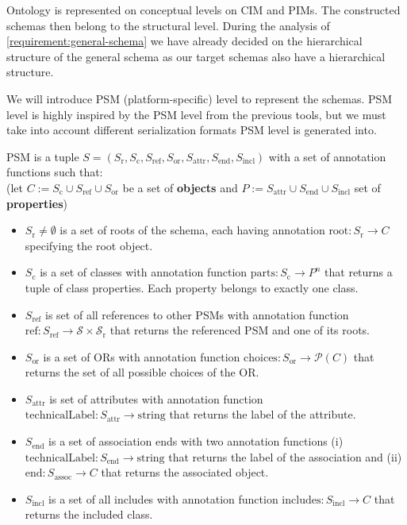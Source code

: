 Ontology is represented on conceptual levels on CIM and PIMs. The constructed schemas then belong to the structural level. During the analysis of \autoref{requirement:general-schema} we have already decided on the hierarchical structure of the general schema as our target schemas also have a hierarchical structure.

We will introduce PSM (platform-specific) level to represent the schemas. PSM level is highly inspired by the PSM level from the previous tools, but we must take into account different serialization formats PSM level is generated into.

\begin{definition}[PSM]
    PSM is a tuple $S=(S_{\textrm{r}}, S_{\textrm{c}}, S_{\textrm{ref}}, S_{\textrm{or}}, S_{\textrm{attr}}, S_{\textrm{end}}, S_{\textrm{incl}})$ with a set of annotation functions such that:
    \\(let $C:=S_{\textrm{c}}\cup S_{\textrm{ref}}\cup S_{\textrm{or}}$ be a set of \textbf{objects} and $P:=S_{\textrm{attr}}\cup S_{\textrm{end}}\cup S_{\textrm{incl}}$ set of \textbf{properties})
    \begin{itemize}
        \item $S_{\textrm{r}} \neq \emptyset$ is a set of roots of the schema, each having annotation $\textrm{root}: S_{\textrm{r}} \rightarrow C$ specifying the root object.

        \item $S_{\textrm{c}}$ is a set of classes with annotation function $\textrm{parts}: S_{\textrm{c}} \rightarrow P^n$ that returns a tuple of class properties. Each property belongs to exactly one class.

        \item $S_{\textrm{ref}}$ is set of all references to other PSMs with annotation function $\textrm{ref}: S_{\textrm{ref}} \rightarrow \mathcal{S} \times \mathcal{S}_{\textrm{r}}$ that returns the referenced PSM and one of its roots.

        \item $S_{\textrm{or}}$ is a set of ORs with annotation function $\textrm{choices}: S_{\textrm{or}} \rightarrow \mathcal{P}(C)$ that returns the set of all possible choices of the OR.

        \item $S_{\textrm{attr}}$ is set of attributes with annotation function $\textrm{technicalLabel}: S_{\textrm{attr}} \rightarrow \textrm{string}$ that returns the label of the attribute.

        \item $S_{\textrm{end}}$ is a set of association ends with two annotation functions (i)\\$\textrm{technicalLabel}: S_{\textrm{end}} \rightarrow \textrm{string}$ that returns the label of the association and (ii) $\textrm{end}: S_{\textrm{assoc}} \rightarrow C$ that returns the associated object.

        \item $S_{\textrm{incl}}$ is a set of all includes with annotation function $\textrm{includes}: S_{\textrm{incl}} \rightarrow C$ that returns the included class.
    \end{itemize}
\end{definition}
